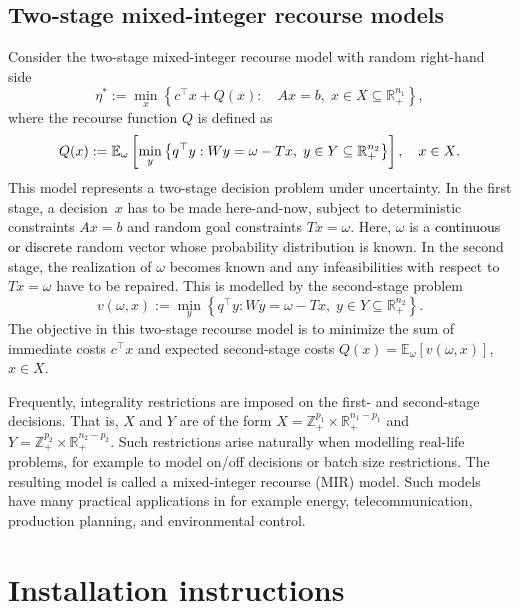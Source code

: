 \documentclass[12pt, english]{article}
\newcommand{\red}{\textcolor{black}}
\begin{document}
\subsection{Two-stage mixed-integer recourse models\label{subsec:model}}

Consider the two-stage mixed-integer recourse model with random right-hand side \begin{equation}\label{etastar}\eta^* := \min_{x}\left\{c^{\top}x + Q(x) :\quad Ax = b,\;x \in X\subseteq \mathbb{R}^{n_1}_+\right\},\end{equation} where the recourse function $Q$ is defined as \begin{equation}\label{defQ}Q(x):=\mathbb{E}_{\omega}\left[ \min_y \left\{   q^{\top}y: Wy = \omega - Tx,\; y \in Y \subseteq \mathbb R^{n_2 }_+\right\}\right]  , \quad x\in \red{X}. \end{equation}This model represents a two-stage decision problem under uncertainty. In the first stage, a decision~$x$ has to be made here-and-now, subject to deterministic constraints $Ax = b$ and random goal constraints $Tx = \omega$. Here, $\omega$ is a \red{continuous or discrete} random vector whose probability distribution is known. In the second stage, the realization of $\omega$ becomes known and any infeasibilities with respect to $Tx = \omega$ have to be repaired. This is modelled by the second-stage problem \begin{equation}\label{vwx}v(\omega,x) := \min_y \left\{   q^{\top}y:Wy = \omega - Tx,\; y \in Y \subseteq  \mathbb{R} ^{n_2 }_+\right\}.\end{equation}The objective in this two-stage recourse model is to minimize the sum of immediate costs $c^{\top}x$ and expected second-stage costs $Q(x) = \mathbb{E}_\omega[v(\omega,x)]$, ${x \in X}$.

Frequently, integrality restrictions are imposed on the first- and second-stage decisions. That is, $X$ and $Y$ are of the form $X = \mathbb Z^{p_1}_+ \times \mathbb{R}^{n_1 - p_1}_+$ and $Y = \mathbb Z^{p_2}_+\times \mathbb{R}^{n_2 - p_2}_+$. Such restrictions arise naturally when modelling real-life problems, for example to model on/off decisions or batch size restrictions. The resulting model is called a mixed-integer recourse (MIR) model.
Such models have many practical applications in for example energy, telecommunication, production planning, and environmental control.

\section{Installation instructions}
\label{sec:installation_instructions}
\end{document}
